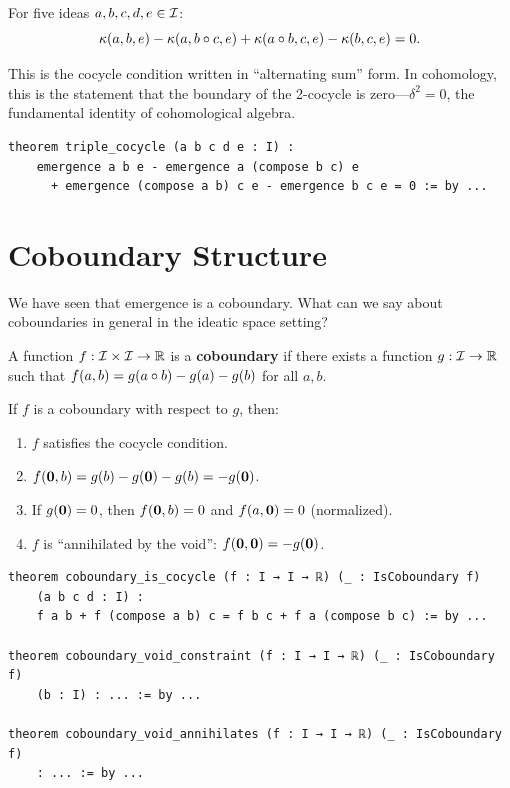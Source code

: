 \begin{theorem}
\label{thm:triple-cocycle}
For five ideas $a, b, c, d, e \in \mathcal{I}$:
\[
  \kappa(a, b, e) - \kappa(a, b \circ c, e) + \kappa(a \circ b, c, e) - \kappa(b, c, e) = 0.
\]
\end{theorem}

This is the cocycle condition written in ``alternating sum'' form. In cohomology,
this is the statement that the boundary of the 2-cocycle is zero---$\delta^2 = 0$,
the fundamental identity of cohomological algebra.

\begin{lstlisting}[caption={Triple cocycle (IDT\_v3\_Emergence.lean)}]
theorem triple_cocycle (a b c d e : I) :
    emergence a b e - emergence a (compose b c) e
      + emergence (compose a b) c e - emergence b c e = 0 := by ...
\end{lstlisting}


\section{Coboundary Structure}

We have seen that emergence is a coboundary. What can we say about coboundaries
in general in the ideatic space setting?

\begin{definition}[Coboundary]
\label{def:coboundary}
A function $f : \mathcal{I} \times \mathcal{I} \to \mathbb{R}$ is a \textbf{coboundary} if there exists
a function $g : \mathcal{I} \to \mathbb{R}$ such that $f(a,b) = g(a \circ b) - g(a) - g(b)$
for all $a, b$.
\end{definition}

\begin{theorem}
\label{thm:coboundary-properties}
If $f$ is a coboundary with respect to $g$, then:
\begin{enumerate}
  \item $f$ satisfies the cocycle condition.
  \item $f(\mathbf{0}, b) = g(b) - g(\mathbf{0}) - g(b) = -g(\mathbf{0})$.
  \item If $g(\mathbf{0}) = 0$, then $f(\mathbf{0}, b) = 0$ and $f(a, \mathbf{0}) = 0$
    (normalized).
  \item $f$ is ``annihilated by the void'': $f(\mathbf{0}, \mathbf{0}) = -g(\mathbf{0})$.
\end{enumerate}
\end{theorem}

\begin{lstlisting}[caption={Coboundary structure (IDT\_v3\_Emergence.lean)}]
theorem coboundary_is_cocycle (f : I → I → ℝ) (_ : IsCoboundary f)
    (a b c d : I) :
    f a b + f (compose a b) c = f b c + f a (compose b c) := by ...

theorem coboundary_void_constraint (f : I → I → ℝ) (_ : IsCoboundary f)
    (b : I) : ... := by ...

theorem coboundary_void_annihilates (f : I → I → ℝ) (_ : IsCoboundary f)
    : ... := by ...
\end{lstlisting}

